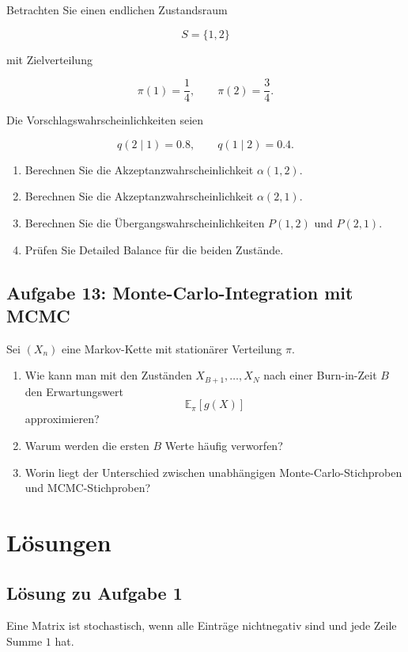 \documentclass[11pt,a4paper]{article}
\newcommand{\E}{\mathbb{E}}
\begin{document}
Betrachten Sie einen endlichen Zustandsraum

\[
S=\{1,2\}
\]

mit Zielverteilung

\[
\pi(1)=\frac14,
\qquad
\pi(2)=\frac34.
\]

Die Vorschlagswahrscheinlichkeiten seien

\[
q(2\mid 1)=0.8,
\qquad
q(1\mid 2)=0.4.
\]

\begin{enumerate}
    \item Berechnen Sie die Akzeptanzwahrscheinlichkeit $\alpha(1,2)$.
    \item Berechnen Sie die Akzeptanzwahrscheinlichkeit $\alpha(2,1)$.
    \item Berechnen Sie die Übergangswahrscheinlichkeiten $P(1,2)$ und $P(2,1)$.
    \item Prüfen Sie Detailed Balance für die beiden Zustände.
\end{enumerate}

\subsection*{Aufgabe 13: Monte-Carlo-Integration mit MCMC}

Sei $(X_n)$ eine Markov-Kette mit stationärer Verteilung $\pi$.

\begin{enumerate}
    \item Wie kann man mit den Zuständen $X_{B+1},\dots,X_N$ nach einer Burn-in-Zeit $B$ den Erwartungswert
    \[
    \E_\pi[g(X)]
    \]
    approximieren?
    \item Warum werden die ersten $B$ Werte häufig verworfen?
    \item Worin liegt der Unterschied zwischen unabhängigen Monte-Carlo-Stichproben und MCMC-Stichproben?
\end{enumerate}

\newpage

\section*{Lösungen}

\subsection*{Lösung zu Aufgabe 1}

Eine Matrix ist stochastisch, wenn alle Einträge nichtnegativ sind und jede Zeile Summe $1$ hat.
\end{document}

